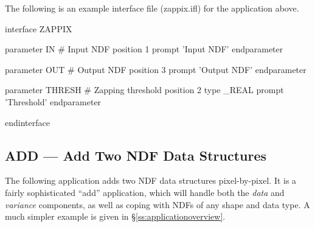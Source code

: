 \documentclass[twoside,11pt,nolof]{starlink}
\providecommand{\st}[1]{{\emph{#1}}}
\begin{document}
The following is an example  interface file
(zappix.ifl) for the application above.

\small
\begin{terminalv}
interface ZAPPIX

   parameter IN                  # Input NDF
      position 1
      prompt   'Input NDF'
   endparameter

   parameter OUT                 # Output NDF
      position 3
      prompt   'Output NDF'
   endparameter

   parameter THRESH              # Zapping threshold
      position 2
      type     _REAL
      prompt   'Threshold'
   endparameter

endinterface
\end{terminalv}
\normalsize


\newpage
\subsection{\label{ss:addexample}ADD --- Add Two NDF Data Structures}

The following application adds two NDF data structures pixel-by-pixel. It is a
fairly sophisticated ``add'' application, which will handle both the
\st{data\/} and \st{variance\/} components, as well as coping with
NDFs of any
shape and data type.  A much simpler example is given in
\S\ref{ss:applicationoverview}.
\end{document}
